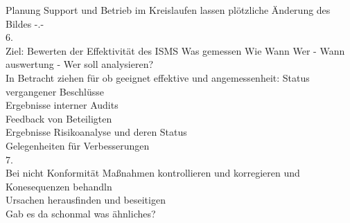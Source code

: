 \documentclass[a4paper,10pt]{scrartcl}
\begin{document}
Planung Support und Betrieb im Kreislaufen lassen plötzliche Änderung des Bildes -.-\\
6.\\
Ziel: Bewerten der Effektivität des ISMS Was gemessen Wie Wann Wer - Wann auswertung - Wer soll analysieren?\\
In Betracht ziehen für ob geeignet effektive und angemessenheit: Status vergangener Beschlüsse\\
Ergebnisse interner Audits\\
Feedback von Beteiligten\\
Ergebnisse Risikoanalyse und deren Status\\
Gelegenheiten für Verbesserungen\\
7.\\
Bei nicht Konformität Maßnahmen kontrollieren
und korregieren und Konesequenzen behandln\\
Ursachen herausfinden und beseitigen\\
Gab es da schonmal was ähnliches?\\
\end{document}
